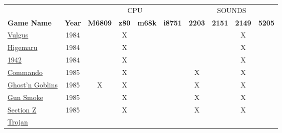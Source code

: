\begin{figure}[H]
{ 
\setlength{\tabcolsep}{3.0pt}
\setlength\cmidrulewidth{\heavyrulewidth} %
\begin{tabularx}{\textwidth}{Xccccccccc}

  & & \multicolumn{4}{c}{CPU} &  \multicolumn{4}{c}{SOUNDS} \\
  \cmidrule(lr){3-6}
  \cmidrule(lr){7-10}
 
  \textbf{Game Name} & \textbf{Year} & \textbf{M6809} & \textbf{z80} & \textbf{m68k} & \textbf{i8751} & \textbf{2203} & \textbf{2151} & \textbf{2149} & \textbf{5205} \\               
  \toprule    
\href{https://www.youtube.com/watch?v=45ELzG1ivEA}{Vulgus}
                & 1984          &               &      X       &              &              &               &               &       X       &               \\
\href{https://www.youtube.com/watch?v=R5mg6XPqtBs}{Higemaru}
                & 1984          &               &      X       &              &              &               &               &       X       &               \\
\href{https://www.youtube.com/watch?v=Em7UwOOBvlA}{1942}
                & 1984          &               &      X       &              &              &               &               &       X       &               \\
  \toprule    
\href{https://www.youtube.com/watch?v=1qctKI_t5eY}{Commando}
                & 1985          &               &      X       &              &              &       X       &               &       X       &               \\
\href{https://www.youtube.com/watch?v=SugLAqaPhqA}{Ghost'n Goblins}  
                & 1985          &       X       &      X       &              &              &       X       &               &       X       &               \\
\href{https://www.youtube.com/watch?v=mrO9qwGXdy8}{Gun Smoke}        
                & 1985          &               &      X       &              &              &       X       &               &       X       &               \\
\href{https://www.youtube.com/watch?v=cIC2mNNryZg}{Section Z}
                & 1985          &               &      X       &              &              &       X       &               &       X       &               \\
  \toprule    
\href{https://www.youtube.com/watch?v=L1FVWdlQNG8}{Trojan}

\end{tabularx}}
\end{figure}
